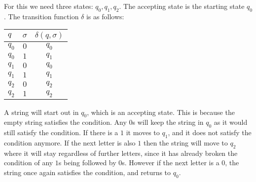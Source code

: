 For this we need three states: $q_0, q_1, q_2$. The accepting state is the starting state $q_0$. The transition function $\delta$ is as follows:

\begin{center}
\begin{tabular}{lcc}
$q$ & $\sigma$ & $\delta(q, \sigma)$ \\ \hline
$q_0$ & $0$ & $q_0$ \\
$q_0$ & $1$ & $q_1$ \\
$q_1$ & $0$ & $q_0$ \\
$q_1$ & $1$ & $q_1$ \\
$q_2$ & $0$ & $q_2$ \\
$q_2$ & $1$ & $q_2$ \\
\end{tabular}
\end{center}

A string will start out in $q_0$, which is an accepting state. This is because the empty string satisfies the condition. Any $0$s will keep the string in $q_0$ as it would still satisfy the condition. If there is a $1$ it moves to $q_1$, and it does not satisfy the condition anymore. If the next letter is also $1$ then the string will move to $q_2$ where it will stay regardless of further letters, since it has already broken the condition of any $1$s being followed by $0$s. However if the next letter is a $0$, the string once again satisfies the condition, and returns to $q_0$.


